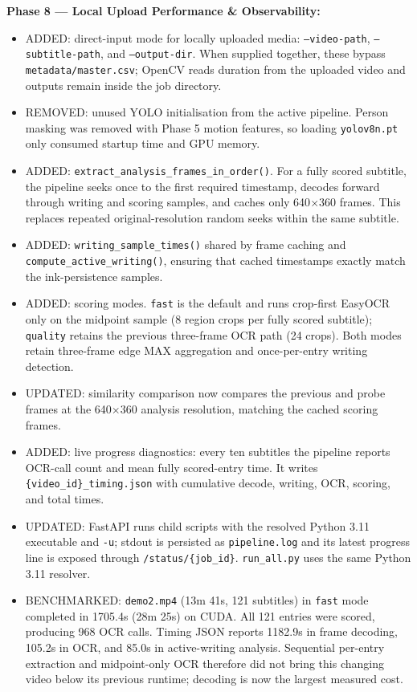 \documentclass[11pt]{article}
\begin{document}
\textbf{Phase 8 --- Local Upload Performance \& Observability:}
\begin{itemize}[leftmargin=1.2em]
    \item ADDED: direct-input mode for locally uploaded media: \texttt{--video-path}, \texttt{--subtitle-path}, and \texttt{--output-dir}. When supplied together, these bypass \texttt{metadata/master.csv}; OpenCV reads duration from the uploaded video and outputs remain inside the job directory.
    \item REMOVED: unused YOLO initialisation from the active pipeline. Person masking was removed with Phase 5 motion features, so loading \texttt{yolov8n.pt} only consumed startup time and GPU memory.
    \item ADDED: \texttt{extract\_analysis\_frames\_in\_order()}. For a fully scored subtitle, the pipeline seeks once to the first required timestamp, decodes forward through writing and scoring samples, and caches only 640$\times$360 frames. This replaces repeated original-resolution random seeks within the same subtitle.
    \item ADDED: \texttt{writing\_sample\_times()} shared by frame caching and \texttt{compute\_active\_writing()}, ensuring that cached timestamps exactly match the ink-persistence samples.
    \item ADDED: scoring modes. \texttt{fast} is the default and runs crop-first EasyOCR only on the midpoint sample (8 region crops per fully scored subtitle); \texttt{quality} retains the previous three-frame OCR path (24 crops). Both modes retain three-frame edge MAX aggregation and once-per-entry writing detection.
    \item UPDATED: similarity comparison now compares the previous and probe frames at the 640$\times$360 analysis resolution, matching the cached scoring frames.
    \item ADDED: live progress diagnostics: every ten subtitles the pipeline reports OCR-call count and mean fully scored-entry time. It writes \texttt{\{video\_id\}\_timing.json} with cumulative decode, writing, OCR, scoring, and total times.
    \item UPDATED: FastAPI runs child scripts with the resolved Python 3.11 executable and \texttt{-u}; stdout is persisted as \texttt{pipeline.log} and its latest progress line is exposed through \texttt{/status/\{job\_id\}}. \texttt{run\_all.py} uses the same Python 3.11 resolver.
    \item BENCHMARKED: \texttt{demo2.mp4} (13m 41s, 121 subtitles) in \texttt{fast} mode completed in 1705.4s (28m 25s) on CUDA. All 121 entries were scored, producing 968 OCR calls. Timing JSON reports 1182.9s in frame decoding, 105.2s in OCR, and 85.0s in active-writing analysis. Sequential per-entry extraction and midpoint-only OCR therefore did not bring this changing video below its previous runtime; decoding is now the largest measured cost.
\end{itemize}
\end{document}
